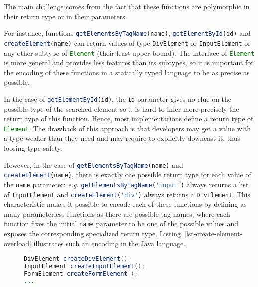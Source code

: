 \documentclass{llncs}
\newcommand{\jscode}[1]{\lstinline[language=JavaScript]|#1|}
\begin{document}
The main challenge comes from the fact that these functions are polymorphic in their return type or in their parameters.

For instance, functions \jscode{getElementsByTagName(name)}, \jscode{getElementById(id)} and \jscode{createElement(name)} can return values of type \jscode{DivElement} or \jscode{InputElement} or any other subtype of \jscode{Element} (their least upper bound). The interface of \jscode{Element} is more general and provides less features than its subtypes, so it is important for the encoding of these functions in a statically typed language to be as precise as possible.

In the case of \jscode{getElementById(id)}, the \jscode{id} parameter gives no clue on the possible type of the searched element so it is hard to infer more precisely the return type of this function. Hence, most implementations define a return type of \jscode{Element}. The drawback of this approach is that developers may get a value with a type weaker than they need and may require to explicitly downcast it, thus loosing type safety.

However, in the case of \jscode{getElementsByTagName(name)} and \jscode{createElement(name)}, there is exactly one possible return type for each value of the \jscode{name} parameter: \emph{e.g.} \jscode{getElementsByTagName('input')} always returns a list of \jscode{InputElement} and \jscode{createElement('div')} always returns a \jscode{DivElement}. This characteristic makes it possible to encode each of these functions by defining as many parameterless functions as there are possible tag names, where each function fixes the initial \jscode{name} parameter to be one of the possible values and exposes the corresponding specialized return type. Listing~\ref{lst-create-element-overload} illustrates such an encoding in the Java language.

\begin{figure}
\begin{lstlisting}[label=lst-create-element-overload,language=Java,caption={Encoding of the \jscode{createElement(name)} function in Java using parameterless functions fixing the initial \jscode{name} parameter value}]
DivElement createDivElement();
InputElement createInputElement();
FormElement createFormElement();
...
\end{lstlisting}
\end{figure}
\end{document}
